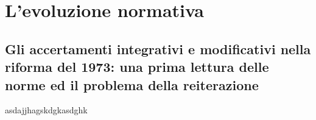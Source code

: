 \chapter{L'evoluzione normativa}
\section{Gli accertamenti integrativi e modificativi nella riforma del 1973: una prima lettura delle norme ed il problema della reiterazione}
asdajjhagskdgkasdghk
